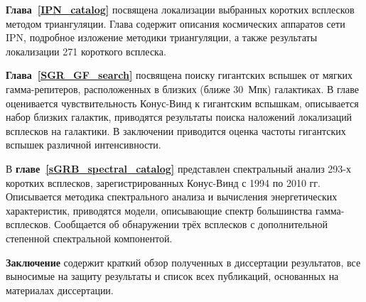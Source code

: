 \textbf{Глава~\ref{IPN_catalog}} посвящена локализации выбранных коротких всплесков 
методом триангуляции. Глава содержит описания космических аппаратов сети IPN, 
подробное изложение методики триангуляции, а также результаты локализации 
271 короткого всплеска.  

\textbf{Глава~\ref{SGR_GF_search}} посвящена поиску гигантских вспышек от мягких
гамма-репитеров, расположенных в близких (ближе 30~Мпк) галактиках.
В главе оценивается чувствительность Конус-Винд к гигантским вспышкам, 
описывается набор близких галактик, приводятся результаты поиска наложений локализаций
всплесков на галактики. В заключении приводится оценка частоты гигантских вспышек различной 
интенсивности.

В \textbf{главе~\ref{sGRB_spectral_catalog}} представлен спектральный анализ 293-х
коротких всплесков, зарегистрированных Конус-Винд с 1994 по 2010 гг. 
Описывается методика спектрального анализа и вычисления энергетических характеристик,
приводятся модели, описывающие спектр большинства гамма-всплесков.
Сообщается об обнаружении трёх всплесков с дополнительной степенной спектральной
компонентой. 

\textbf{Заключение} содержит краткий обзор полученных в диссертации результатов, 
все выносимые на защиту результаты и список всех публикаций, 
основанных на материалах диссертации.

\clearpage